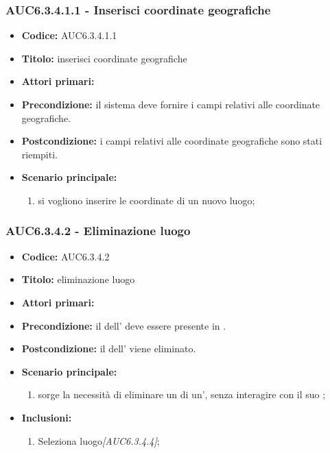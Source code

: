 \documentclass[casi-duso]{subfiles}
\begin{document}
\subsubsection{AUC6.3.4.1.1 - Inserisci coordinate geografiche}%
\label{subsub:AUC6.3.4.1.1}
\begin{itemize}
  \item \textbf{Codice:} AUC6.3.4.1.1
  \item \textbf{Titolo:} inserisci coordinate geografiche
  \item \textbf{Attori primari:} 
  \item \textbf{Precondizione:} il sistema deve fornire i campi relativi alle coordinate geografiche.
  \item \textbf{Postcondizione:} i campi relativi alle coordinate geografiche sono stati riempiti.
  \item \textbf{Scenario principale:}
  \begin{enumerate}
    \item si vogliono inserire le coordinate di un nuovo luogo;
  \end{enumerate}
\end{itemize}

\subsubsection{AUC6.3.4.2 - Eliminazione luogo}%
\label{subsub:AUC6.3.4.2}
\begin{itemize}
  \item \textbf{Codice:} AUC6.3.4.2
  \item \textbf{Titolo:} eliminazione luogo
  \item \textbf{Attori primari:} 
  \item \textbf{Precondizione:} il  dell' deve essere presente in .
  \item \textbf{Postcondizione:} il  dell' viene eliminato.
  \item \textbf{Scenario principale:}
  \begin{enumerate}
    \item sorge la necessità di eliminare un  di un', senza interagire con il suo ;
  \end{enumerate}
  \item \textbf{Inclusioni:}
  \begin{enumerate}
    \item Seleziona luogo\emph{[AUC6.3.4.4]};
  \end{enumerate}
\end{itemize}
\end{document}

